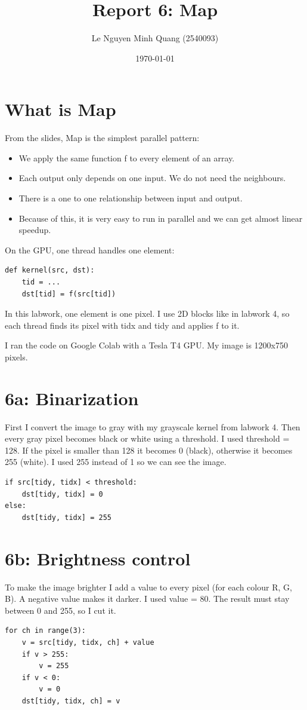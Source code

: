 \documentclass[11pt,a4paper]{article}
\title{Report 6: Map}
\author{Le Nguyen Minh Quang (2540093)}
\date{\today}
\begin{document}
\maketitle

\section{What is Map}
From the slides, Map is the simplest parallel pattern:
\begin{itemize}
  \item We apply the same function f to every element of an array.
  \item Each output only depends on one input. We do not need the
  neighbours.
  \item There is a one to one relationship between input and output.
  \item Because of this, it is very easy to run in parallel and we can
  get almost linear speedup.
\end{itemize}
On the GPU, one thread handles one element:
\begin{verbatim}
def kernel(src, dst):
    tid = ...
    dst[tid] = f(src[tid])
\end{verbatim}
In this labwork, one element is one pixel. I use 2D blocks like in
labwork 4, so each thread finds its pixel with tidx and tidy and
applies f to it.

I ran the code on Google Colab with a Tesla T4 GPU. My image is
1200x750 pixels.

\section{6a: Binarization}
First I convert the image to gray with my grayscale kernel from
labwork 4. Then every gray pixel becomes black or white using a
threshold. I used threshold = 128. If the pixel is smaller than 128 it
becomes 0 (black), otherwise it becomes 255 (white). I used 255 instead
of 1 so we can see the image.
\begin{verbatim}
if src[tidy, tidx] < threshold:
    dst[tidy, tidx] = 0
else:
    dst[tidy, tidx] = 255
\end{verbatim}

\section{6b: Brightness control}
To make the image brighter I add a value to every pixel (for each
colour R, G, B). A negative value makes it darker. I used value = 80.
The result must stay between 0 and 255, so I cut it.
\begin{verbatim}
for ch in range(3):
    v = src[tidy, tidx, ch] + value
    if v > 255:
        v = 255
    if v < 0:
        v = 0
    dst[tidy, tidx, ch] = v
\end{verbatim}
\end{document}
